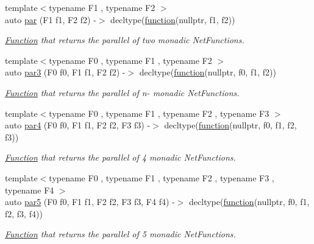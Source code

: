 \begin{DoxyCompactItemize}
{\footnotesize template$<$typename F1 , typename F2 $>$ }\\auto \hyperlink{namespacepfq_1_1lang_1_1anonymous__namespace_02default_8hpp_03_a34805fabe99c4a438ed0a3658e1697a5}{par} (F1 f1, F2 f2) -\/$>$ decltype(\hyperlink{namespacepfq_1_1lang_a1a4638059d700ae08d0ca63886ff2bb3}{function}(nullptr, f1, f2))
\begin{DoxyCompactList}\small\item\em \hyperlink{structpfq_1_1lang_1_1Function}{Function} that returns the parallel of two monadic Net\+Functions. \end{DoxyCompactList}\item 
{\footnotesize template$<$typename F0 , typename F1 , typename F2 $>$ }\\auto \hyperlink{namespacepfq_1_1lang_1_1anonymous__namespace_02default_8hpp_03_ab27a95d906297e5ec97c2d77d2144a80}{par3} (F0 f0, F1 f1, F2 f2) -\/$>$ decltype(\hyperlink{namespacepfq_1_1lang_a1a4638059d700ae08d0ca63886ff2bb3}{function}(nullptr, f0, f1, f2))
\begin{DoxyCompactList}\small\item\em \hyperlink{structpfq_1_1lang_1_1Function}{Function} that returns the parallel of n-\/ monadic Net\+Functions. \end{DoxyCompactList}\item 
{\footnotesize template$<$typename F0 , typename F1 , typename F2 , typename F3 $>$ }\\auto \hyperlink{namespacepfq_1_1lang_1_1anonymous__namespace_02default_8hpp_03_ade490883fcf82e5cf579274e3ee6520d}{par4} (F0 f0, F1 f1, F2 f2, F3 f3) -\/$>$ decltype(\hyperlink{namespacepfq_1_1lang_a1a4638059d700ae08d0ca63886ff2bb3}{function}(nullptr, f0, f1, f2, f3))
\begin{DoxyCompactList}\small\item\em \hyperlink{structpfq_1_1lang_1_1Function}{Function} that returns the parallel of 4 monadic Net\+Functions. \end{DoxyCompactList}\item 
{\footnotesize template$<$typename F0 , typename F1 , typename F2 , typename F3 , typename F4 $>$ }\\auto \hyperlink{namespacepfq_1_1lang_1_1anonymous__namespace_02default_8hpp_03_a495f1dc7f1b0fbe9f822bf5f484cf2ab}{par5} (F0 f0, F1 f1, F2 f2, F3 f3, F4 f4) -\/$>$ decltype(\hyperlink{namespacepfq_1_1lang_a1a4638059d700ae08d0ca63886ff2bb3}{function}(nullptr, f0, f1, f2, f3, f4))
\begin{DoxyCompactList}\small\item\em \hyperlink{structpfq_1_1lang_1_1Function}{Function} that returns the parallel of 5 monadic Net\+Functions. \end{DoxyCompactList}\item 

\end{DoxyCompactItemize}
